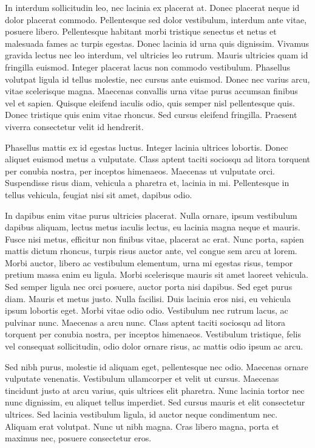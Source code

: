 In interdum sollicitudin leo, nec lacinia ex placerat at. Donec placerat neque id dolor placerat commodo. Pellentesque sed dolor vestibulum, interdum ante vitae, posuere libero. Pellentesque habitant morbi tristique senectus et netus et malesuada fames ac turpis egestas. Donec lacinia id urna quis dignissim. Vivamus gravida lectus nec leo interdum, vel ultricies leo rutrum. Mauris ultricies quam id fringilla euismod. Integer placerat lacus non commodo vestibulum. Phasellus volutpat ligula id tellus molestie, nec cursus ante euismod. Donec nec varius arcu, vitae scelerisque magna. Maecenas convallis urna vitae purus accumsan finibus vel et sapien. Quisque eleifend iaculis odio, quis semper nisl pellentesque quis. Donec tristique quis enim vitae rhoncus. Sed cursus eleifend fringilla. Praesent viverra consectetur velit id hendrerit.

Phasellus mattis ex id egestas luctus. Integer lacinia ultrices lobortis. Donec aliquet euismod metus a vulputate. Class aptent taciti sociosqu ad litora torquent per conubia nostra, per inceptos himenaeos. Maecenas ut vulputate orci. Suspendisse risus diam, vehicula a pharetra et, lacinia in mi. Pellentesque in tellus vehicula, feugiat nisi sit amet, dapibus odio.

In dapibus enim vitae purus ultricies placerat. Nulla ornare, ipsum vestibulum dapibus aliquam, lectus metus iaculis lectus, eu lacinia magna neque et mauris. Fusce nisi metus, efficitur non finibus vitae, placerat ac erat. Nunc porta, sapien mattis dictum rhoncus, turpis risus auctor ante, vel congue sem arcu at lorem. Morbi auctor, libero ac vestibulum elementum, urna mi egestas risus, tempor pretium massa enim eu ligula. Morbi scelerisque mauris sit amet laoreet vehicula. Sed semper ligula nec orci posuere, auctor porta nisi dapibus. Sed eget purus diam. Mauris et metus justo. Nulla facilisi. Duis lacinia eros nisi, eu vehicula ipsum lobortis eget. Morbi vitae odio odio. Vestibulum nec rutrum lacus, ac pulvinar nunc. Maecenas a arcu nunc. Class aptent taciti sociosqu ad litora torquent per conubia nostra, per inceptos himenaeos. Vestibulum tristique, felis vel consequat sollicitudin, odio dolor ornare risus, ac mattis odio ipsum ac arcu.

Sed nibh purus, molestie id aliquam eget, pellentesque nec odio. Maecenas ornare vulputate venenatis. Vestibulum ullamcorper et velit ut cursus. Maecenas tincidunt justo at arcu varius, quis ultrices elit pharetra. Nunc lacinia tortor nec nunc dignissim, eu aliquet tellus imperdiet. Sed cursus mauris et elit consectetur ultrices. Sed lacinia vestibulum ligula, id auctor neque condimentum nec. Aliquam erat volutpat. Nunc ut nibh magna. Cras libero magna, porta et maximus nec, posuere consectetur eros.

